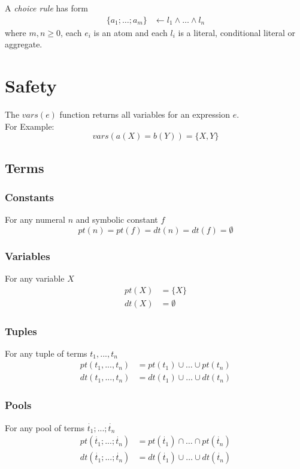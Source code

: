\documentclass{article}
\newcommand{\tuple}[1]{\dot{#1}}
\newcommand{\set}[1]{\{#1\}}
\begin{document}
	A \emph{choice rule} has form
	\begin{align}
		\{a_1; \dots; a_m\} &\leftarrow l_1 \wedge \dots \wedge l_n \label{choice}
	\end{align}
	where
	$m, n \geq 0$,
	each $e_i$ is an atom and
	each $l_i$ is a literal, conditional literal or aggregate.

	\section{Safety}
	The $\mathit{vars(e)}$ function returns all variables for an expression $e$.
	\\ For Example:
	\begin{equation*}
		vars(a(X) = b(Y)) = \set{X,Y}
	\end{equation*}

	\subsection{Terms}
	\subsubsection{Constants}
	For any numeral $n$ and symbolic constant $f$
	\begin{equation*}
		pt(n) = pt(f) = dt(n) = dt(f) = \emptyset
	\end{equation*}

	\subsubsection{Variables}
	For any variable $X$
	\begin{align*}
		pt(X) &= \set{X} \\
		dt(X) &= \emptyset
	\end{align*}

	\subsubsection{Tuples}
	For any tuple of terms $t_1,...,t_n$
	\begin{align*}
		pt(t_1,...,t_n) &= pt(t_1) \cup \dots \cup pt(t_n) \\
		dt(t_1,...,t_n) &= dt(t_1) \cup \dots \cup dt(t_n)
	\end{align*}

	\subsubsection{Pools}
	For any pool of terms $\tuple{t_1};...;\tuple{t_n}$
	\begin{align*}
		pt(\tuple{t_1};...;\tuple{t_n}) &= pt(\tuple{t_1}) \cap \dots \cap pt(\tuple{t_n}) \\
		dt(\tuple{t_1};...;\tuple{t_n}) &= dt(\tuple{t_1}) \cup \dots \cup dt(\tuple{t_n})
	\end{align*}
\end{document}
